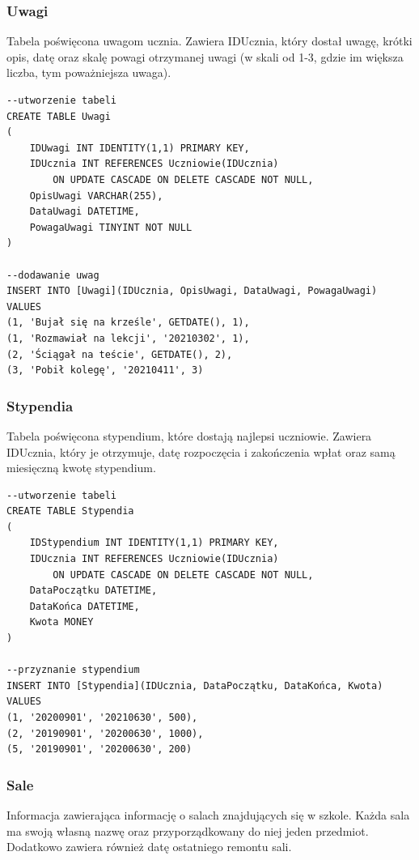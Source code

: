 \documentclass[60pt]{article}
\begin{document}
 \subsubsection{Uwagi}
Tabela poświęcona uwagom ucznia. Zawiera IDUcznia, który dostał uwagę, krótki opis, datę oraz skalę powagi otrzymanej uwagi (w skali od 1-3, gdzie im większa liczba, tym poważniejsza uwaga).
 
\begin{verbatim}
--utworzenie tabeli
CREATE TABLE Uwagi
(
    IDUwagi INT IDENTITY(1,1) PRIMARY KEY,
    IDUcznia INT REFERENCES Uczniowie(IDUcznia) 
        ON UPDATE CASCADE ON DELETE CASCADE NOT NULL,
    OpisUwagi VARCHAR(255),
    DataUwagi DATETIME,
    PowagaUwagi TINYINT NOT NULL
)

--dodawanie uwag
INSERT INTO [Uwagi](IDUcznia, OpisUwagi, DataUwagi, PowagaUwagi) VALUES
(1, 'Bujał się na krześle', GETDATE(), 1),
(1, 'Rozmawiał na lekcji', '20210302', 1),
(2, 'Ściągał na teście', GETDATE(), 2),
(3, 'Pobił kolegę', '20210411', 3)
\end{verbatim}

 \subsubsection{Stypendia}
Tabela poświęcona stypendium, które dostają najlepsi uczniowie. Zawiera IDUcznia, który je otrzymuje, datę rozpoczęcia i zakończenia wpłat oraz samą miesięczną kwotę stypendium.
 
\begin{verbatim}
--utworzenie tabeli
CREATE TABLE Stypendia
(
    IDStypendium INT IDENTITY(1,1) PRIMARY KEY,
    IDUcznia INT REFERENCES Uczniowie(IDUcznia) 
        ON UPDATE CASCADE ON DELETE CASCADE NOT NULL,
    DataPoczątku DATETIME,
    DataKońca DATETIME,
    Kwota MONEY
)

--przyznanie stypendium 
INSERT INTO [Stypendia](IDUcznia, DataPoczątku, DataKońca, Kwota) VALUES
(1, '20200901', '20210630', 500),
(2, '20190901', '20200630', 1000),
(5, '20190901', '20200630', 200)
\end{verbatim}

 \subsubsection{Sale}
Informacja zawierająca informację o salach znajdujących się w szkole. Każda sala ma swoją własną nazwę oraz przyporządkowany do niej jeden przedmiot. Dodatkowo zawiera również datę ostatniego remontu sali.
 
\end{document}

